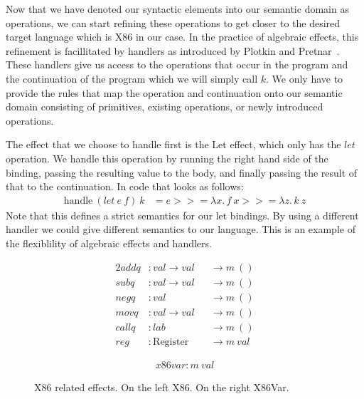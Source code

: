 \documentclass[a4paper,UKenglish,cleveref, autoref, thm-restate, anonymous]{oasics-v2021}
\newcommand\bind[1]{>\!\!>\!\!= \lambda #1.\,}
\begin{document}
Now that we have denoted our syntactic elements into our semantic domain as operations, we can start refining these operations to get closer to the desired target language which is X86 in our case.
In the practice of algebraic effects, this refinement is facillitated by handlers as introduced by Plotkin and Pretnar~\cite{10.1007/978-3-642-00590-9_7}.
These handlers give us access to the operations that occur in the program and the continuation of the program which we will simply call $k$.
We only have to provide the rules that map the operation and continuation onto our semantic domain consisting of primitives, existing operations, or newly introduced operations.

The effect that we choose to handle first is the Let effect, which only has the $\mathit{let}$ operation.
We handle this operation by running the right hand side of the binding, passing the resulting value to the body, and finally passing the result of that to the continuation. In code that looks as follows:
\begin{align*}
  \mathrm{handle}~(\mathit{let}~e~f)~k & = e \bind{x} f~x \bind{z} k~z
\end{align*}
Note that this defines a strict semantics for our let bindings.
By using a different handler we could give different semantics to our language.
This is an example of the flexiblility of algebraic effects and handlers.

\begin{figure}[ht]
  \begin{minipage}{0.4\textwidth}
  \begin{alignat*}{2}
    addq  & : \mathit{val} \to \mathit{val} && \to m~() \\
    subq  & : \mathit{val} \to \mathit{val} && \to m~() \\
    negq  & : \mathit{val}                  && \to m~() \\
    movq  & : \mathit{val} \to \mathit{val} && \to m~() \\
    callq & : \mathit{lab}                  && \to m~() \\
    reg   & : \mathrm{Register}             && \to m~\mathit{val}
  \end{alignat*}
  \end{minipage}
  \begin{minipage}{0.4\textwidth}
  \begin{align*}
    x86var : m~\mathit{val}
  \end{align*}
  \end{minipage}
  \caption{X86 related effects. On the left X86. On the right X86Var.}\label{fig:x86-ops}
\end{figure}
\end{document}
